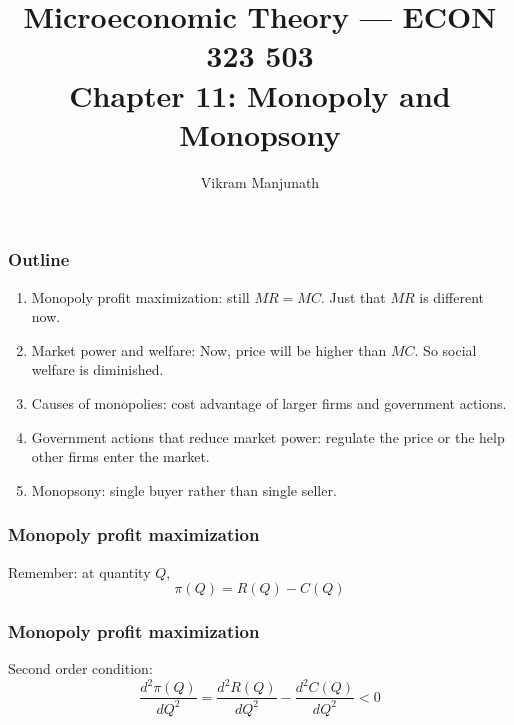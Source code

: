 \documentclass[xcolor=pdftex,dvipsnames]{beamer}
\title{Microeconomic Theory --- ECON 323 503 \\ Chapter 11: Monopoly
  and Monopsony}
\author{Vikram Manjunath}       %
\institute{Texas A\&M University}
\begin{document}
\maketitle

\begin{frame}
\frametitle{Outline}
\begin{enumerate}[<+->]
\item Monopoly profit maximization: still $MR=MC$. Just that $MR$ is
  different now.
\item Market power and welfare: Now, price will be higher than
  $MC$. So social welfare is diminished.
\item  Causes of monopolies: cost advantage of larger firms and
  government actions.
\item  Government actions that reduce market power: regulate the price
  or the help other firms enter the market.
\item Monopsony: single buyer rather than single seller.
\end{enumerate}
\end{frame}


\begin{frame}
  \frametitle{Monopoly profit maximization}
  Remember: at quantity $Q$,
  \[
  \pi(Q) = R(Q) - C(Q)
  \]

\end{frame}

\begin{frame}
  \frametitle{Monopoly profit maximization}
Second order condition:
\[
\frac{d^2\pi(Q)}{dQ^2} = \frac{d^2R(Q)}{dQ^2} - \frac{d^2C(Q)}{dQ^2} < 0
\]
\bigskip



\bigskip

\bigskip

  
\end{frame}
\end{document}
